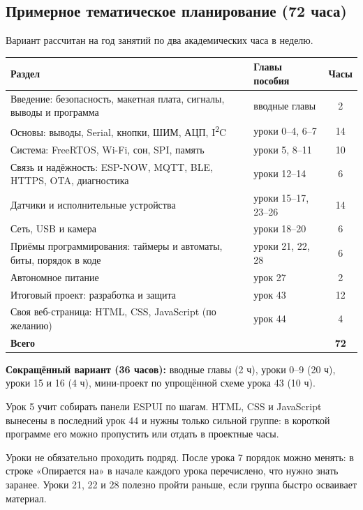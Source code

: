 \subsection*{Примерное тематическое планирование (72 часа)}

Вариант рассчитан на год занятий по два академических часа в неделю.

\begin{center}\small
\begin{tabularx}{\textwidth}{@{}X l c@{}}
\toprule
Раздел & Главы пособия & Часы \\
\midrule
Введение: безопасность, макетная плата, сигналы, выводы и программа & вводные главы & 2 \\
Основы: выводы, Serial, кнопки, ШИМ, АЦП, I\textsuperscript{2}C & уроки 0--4, 6--7 & 14 \\
Система: FreeRTOS, Wi-Fi, сон, SPI, память & уроки 5, 8--11 & 10 \\
Связь и надёжность: ESP-NOW, MQTT, BLE, HTTPS, OTA, диагностика & уроки 12--14 & 6 \\
Датчики и исполнительные устройства & уроки 15--17, 23--26 & 14 \\
Сеть, USB и камера & уроки 18--20 & 6 \\
Приёмы программирования: таймеры и автоматы, биты, порядок в коде & уроки 21, 22, 28 & 6 \\
Автономное питание & урок 27 & 2 \\
Итоговый проект: разработка и защита & урок 43 & 12 \\
Своя веб-страница: HTML, CSS, JavaScript (по желанию) & урок 44 & 4 \\
\midrule
\textbf{Всего} & & \textbf{72} \\
\bottomrule
\end{tabularx}
\end{center}

\textbf{Сокращённый вариант (36 часов):} вводные главы (2 ч), уроки 0--9 (20 ч), уроки 15 и 16 (4 ч),
мини-проект по упрощённой схеме урока 43 (10 ч).

Урок 5 учит собирать панели ESPUI по шагам. HTML, CSS и JavaScript вынесены в последний урок 44 и нужны только сильной группе:
в короткой программе его можно пропустить или отдать в проектные часы.

Уроки не обязательно проходить подряд. После урока 7 порядок можно менять: в строке «Опирается на»
в начале каждого урока перечислено, что нужно знать заранее. Уроки 21, 22 и 28 полезно пройти раньше,
если группа быстро осваивает материал.

